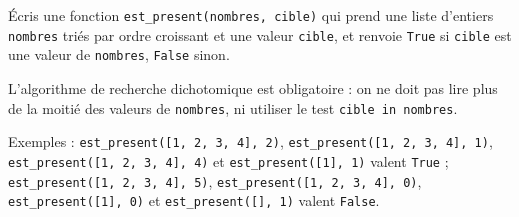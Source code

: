 Écris une fonction \texttt{est\_present(nombres, cible)} qui prend une liste d'entiers \texttt{nombres} triés par ordre croissant et une valeur \texttt{cible}, et renvoie \texttt{True} si \texttt{cible} est une valeur de \texttt{nombres}, \texttt{False} sinon.

L'algorithme de recherche dichotomique est obligatoire : on ne doit pas lire plus de la moitié des valeurs de \texttt{nombres}, ni utiliser le test \texttt{cible in nombres}.

Exemples : \texttt{est\_present([1, 2, 3, 4], 2)}, \texttt{est\_present([1, 2, 3, 4], 1)}, \texttt{est\_present([1, 2, 3, 4], 4)} et \texttt{est\_present([1], 1)} valent \texttt{True} ; \texttt{est\_present([1, 2, 3, 4], 5)}, \texttt{est\_present([1, 2, 3, 4], 0)}, \texttt{est\_present([1], 0)} et \texttt{est\_present([], 1)} valent \texttt{False}.
